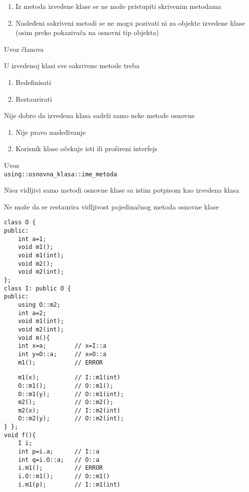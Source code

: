 \documentclass{article}
\newenvironment{xitemize}{%
    
    \itemize
    \larger
}{%
    \enditemize
}
\let\olditemize\itemize
\let\endolditemize\enditemize
\renewenvironment{itemize}{%
    \smaller
    \olditemize
}{%
    \endolditemize
}
\providecommand{\inlinecode}[1]{\texttt{#1}}
\begin{document}
\begin{xitemize}
\begin{itemize}
\begin{enumerate}
        \item Iz metoda izvedene klase se ne može pristupiti skrivenim metodama
        \item Nasleđeni sakriveni metodi se ne mogu pozivati ni za objekte izvedene klase (osim preko pokazivača na osnovni tip objekta)
    \end{enumerate}
\end{itemize}
\item Uvoz članova
\begin{itemize}
    \item U izvedenoj klasi sve sakrivene metode treba
    \begin{enumerate}
        \item Redefinisati
        \item Restaurirati
    \end{enumerate}
    \item Nije dobro da izvedena klasa sadrži samo neke metode osnovne
    \begin{enumerate}
        \item Nije pravo nasleđivanje
        \item Korisnik klase očekuje isti ili prošireni interfejs
    \end{enumerate}
    \item Uvoz \\
    \inlinecode{using::osnovna\_klasa::ime\_metoda}
    \item Nisu vidljivi samo metodi osnovne klase sa istim potpisom kao izvedena klasa
    \item Ne može da se restaurira vidljivost pojedinačnog metoda osnovne klase
    \begin{multicols}{2}
\begin{lstlisting}
class O { 
public:
    int a=1;
    void m1();
    void m1(int);
    void m2();
    void m2(int);
};
class I: public O {
public:
    using O::m2;
    int a=2;
    void m1(int);
    void m2(int);
    void m(){
    int x=a;        // x=I::a
    int y=O::a;     // x=O::a
    m1();           // ERROR
\end{lstlisting}
\columnbreak
\begin{lstlisting}
    m1(x);          // I::m1(int)
    O::m1();        // O::m1();
    O::m1(y);       // O::m1(int);
    m2();           // O::m2();
    m2(x);          // I::m2(int)
    O::m2(y);       // O::m2(int);
} };
void f(){
    I i;
    int p=i.a;      // I::a
    int q=i.O::a;   // O::a
    i.m1();         // ERROR
    i.O::m1();      // O::m1()
    i.m1(p);        // I::m1(int)

\end{lstlisting}
\end{multicols}
\end{itemize}
\end{xitemize}
\end{document}
